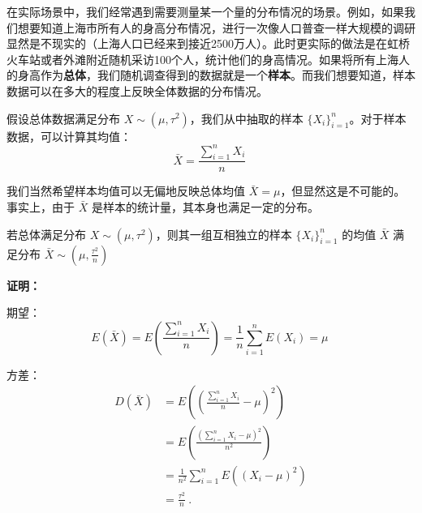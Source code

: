 
在实际场景中，我们经常遇到需要测量某一个量的分布情况的场景。例如，如果我们想要知道上海市所有人的身高分布情况，进行一次像人口普查一样大规模的调研显然是不现实的（上海人口已经来到接近2500万人）。此时更实际的做法是在虹桥火车站或者外滩附近随机采访100个人，统计他们的身高情况。如果将所有上海人的身高作为\textbf{总体}，我们随机调查得到的数据就是一个\textbf{样本}。而我们想要知道，样本数据可以在多大的程度上反映全体数据的分布情况。

假设总体数据满足分布 $X\sim(\mu, \tau^2)$，我们从中抽取的样本 $\{X_i \}_{i=1}^n$。对于样本数据，可以计算其均值：\begin{equation}
\bar X=\frac{\sum_{i=1}^n X_i}{n}~
\end{equation}

我们当然希望样本均值可以无偏地反映总体均值 $\bar X=\mu$，但显然这是不可能的。事实上，由于 $\bar X$ 是样本的统计量，其本身也满足一定的分布。

\begin{theorem}{}
若总体满足分布 $X\sim (\mu, \tau^2)$，则其一组互相独立的样本 $\{X_i \}_{i=1}^n$ 的均值 $\bar X$ 满足分布 $\bar X\sim (\mu, \frac{\tau^2}{n})$
\end{theorem}
\textbf{证明：}

期望：
\begin{equation}
E(\bar X) =E(\frac{\sum_{i=1}^n X_i}{n}) 
        =\frac 1 n \sum_{i=1}^n E(X_i)=\mu~
\end{equation}

方差：
\begin{equation}
\begin{aligned}
D(\bar X) &=E((\frac{\sum_{i=1}^n X_i}{n}-\mu)^2)\\
&= E(\frac{(\sum_{i=1}^n X_i-\mu)^2}{n^2}) \\
&=\frac {1} {n^2} \sum_{i=1}^n E((X_i-\mu)^2) \\
&=\frac {\tau^2}{n}~.
\end{aligned}
\end{equation}

